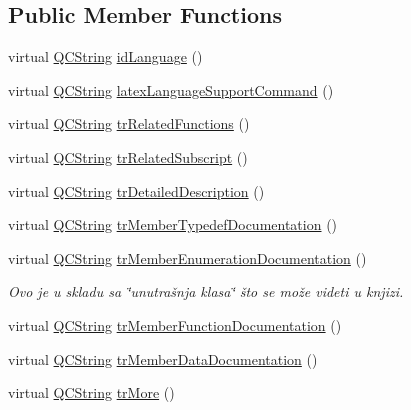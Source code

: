 \subsection*{Public Member Functions}
\begin{DoxyCompactItemize}
\item 
virtual \mbox{\hyperlink{class_q_c_string}{Q\+C\+String}} \mbox{\hyperlink{class_translator_serbian_a2580f17cd21e0f91bc9775dd0a163ae5}{id\+Language}} ()
\item 
virtual \mbox{\hyperlink{class_q_c_string}{Q\+C\+String}} \mbox{\hyperlink{class_translator_serbian_a54aa2c09cfa4c090dd27f8c1f7ac8f45}{latex\+Language\+Support\+Command}} ()
\item 
virtual \mbox{\hyperlink{class_q_c_string}{Q\+C\+String}} \mbox{\hyperlink{class_translator_serbian_acc0e53868672f3f9243867a686b9e4a9}{tr\+Related\+Functions}} ()
\item 
virtual \mbox{\hyperlink{class_q_c_string}{Q\+C\+String}} \mbox{\hyperlink{class_translator_serbian_a8fe68f00e076364d5936330765388301}{tr\+Related\+Subscript}} ()
\item 
virtual \mbox{\hyperlink{class_q_c_string}{Q\+C\+String}} \mbox{\hyperlink{class_translator_serbian_a1ff22edadca264eb2479eb72ede71506}{tr\+Detailed\+Description}} ()
\item 
virtual \mbox{\hyperlink{class_q_c_string}{Q\+C\+String}} \mbox{\hyperlink{class_translator_serbian_afb494d048acafc08191ef14825bd17ce}{tr\+Member\+Typedef\+Documentation}} ()
\item 
virtual \mbox{\hyperlink{class_q_c_string}{Q\+C\+String}} \mbox{\hyperlink{class_translator_serbian_abd1512013613cc9ae0a6bc43ee68947b}{tr\+Member\+Enumeration\+Documentation}} ()
\begin{DoxyCompactList}\small\item\em Ovo je u skladu sa \char`\"{}unutrašnja klasa\char`\"{} što se može videti u knjizi. \end{DoxyCompactList}\item 
virtual \mbox{\hyperlink{class_q_c_string}{Q\+C\+String}} \mbox{\hyperlink{class_translator_serbian_a53ecd045c02cbfaa34f453ec4ec0ecc0}{tr\+Member\+Function\+Documentation}} ()
\item 
virtual \mbox{\hyperlink{class_q_c_string}{Q\+C\+String}} \mbox{\hyperlink{class_translator_serbian_a38b41a81acc35d80270efad6dcef6daa}{tr\+Member\+Data\+Documentation}} ()
\item 
virtual \mbox{\hyperlink{class_q_c_string}{Q\+C\+String}} \mbox{\hyperlink{class_translator_serbian_ac7995605321e0fdbbd9d8c28cfc58f82}{tr\+More}} ()

\end{DoxyCompactItemize}
